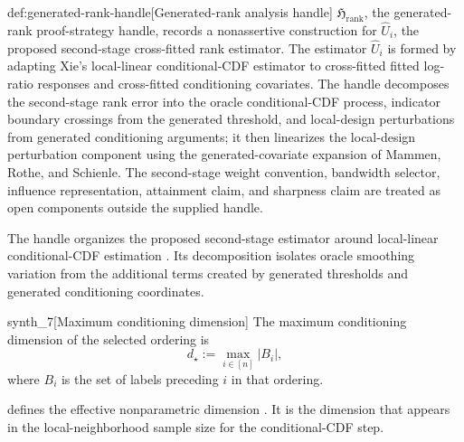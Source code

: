 \documentclass[11pt]{article}
\begin{document}
\begin{remarkv}{def:generated-rank-handle}[Generated-rank analysis handle]
\(\mathfrak H_{\mathrm{rank}}\), the generated-rank proof-strategy handle, records a nonassertive construction for \(\widehat U_i\), the proposed second-stage cross-fitted rank estimator. The estimator \(\widehat U_i\) is formed by adapting Xie's local-linear conditional-CDF estimator to cross-fitted fitted log-ratio responses and cross-fitted conditioning covariates. The handle decomposes the second-stage rank error into the oracle conditional-CDF process, indicator boundary crossings from the generated threshold, and local-design perturbations from generated conditioning arguments; it then linearizes the local-design perturbation component using the generated-covariate expansion of Mammen, Rothe, and Schienle. The second-stage weight convention, bandwidth selector, influence representation, attainment claim, and sharpness claim are treated as open components outside the supplied handle.
\end{remarkv}

The handle  organizes the proposed second-stage estimator  around local-linear conditional-CDF estimation \citep{FanGijbels1996,Fan1996,Xie2023UniformConditionalCDF}. Its decomposition isolates oracle smoothing variation from the additional terms created by generated thresholds and generated conditioning coordinates.

\begin{definitionv}{synth_7}[Maximum conditioning dimension]
The maximum conditioning dimension of the selected ordering is
\[
d_\star := \max_{i\in[n]} |B_i|,
\]
where \(B_i\) is the set of labels preceding \(i\) in that ordering.
\end{definitionv}

 defines the effective nonparametric dimension . It is the dimension that appears in the local-neighborhood sample size for the conditional-CDF step.
\end{document}
